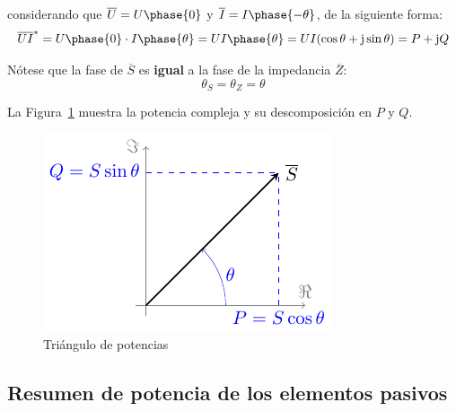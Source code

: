 \begin{itemize}
  considerando que $\overline{U} = U\phase{0}$ y
  $\overline{I} = I\phase{-\theta}$, de la siguiente forma:
  \begin{equation*}
    \overline{U} \overline{I}^* = U\phase{0} \cdot I\phase{\theta} = UI\phase{\theta}= U I (\cos\theta + \mathrm{j} \sin\theta) = P + \mathrm{j} Q
  \end{equation*}
  \begin{remark}
    Nótese que la fase de $\overline{S}$ es \textbf{igual} a la fase
    de la impedancia $\overline{Z}$:
    \begin{equation*}
      \theta_S = \theta_Z = \theta
    \end{equation*}
  \end{remark}
  La Figura~\ref{fig:trianguloPotencias} muestra la potencia compleja
  y su descomposición en $P$ y $Q$.
  \begin{figure}[H]
    \centering \includegraphics{../figs/trianguloPotencias.pdf}
    \caption{Triángulo de potencias}
    \label{fig:trianguloPotencias}
  \end{figure}
\end{itemize}
	
	
\subsection{Resumen de potencia de los elementos pasivos}
	
